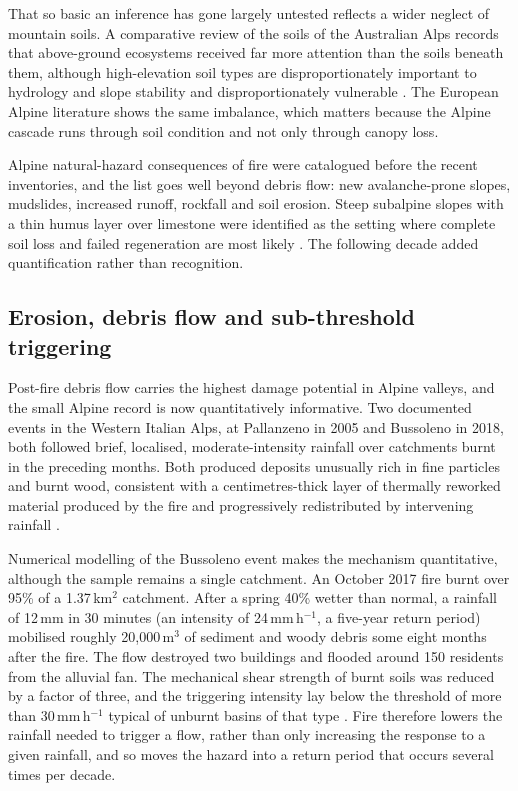 \documentclass[11pt,a4paper]{article}
\begin{document}
That so basic an inference has gone largely untested reflects a wider neglect of mountain soils. A comparative review of the soils of the Australian Alps records that above-ground ecosystems received far more attention than the soils beneath them, although high-elevation soil types are disproportionately important to hydrology and slope stability and disproportionately vulnerable \citep{wilson_distribution_2022}. The European Alpine literature shows the same imbalance, which matters because the Alpine cascade runs through soil condition and not only through canopy loss.

Alpine natural-hazard consequences of fire were catalogued before the recent inventories, and the list goes well beyond debris flow: new avalanche-prone slopes, mudslides, increased runoff, rockfall and soil erosion. Steep subalpine slopes with a thin humus layer over limestone were identified as the setting where complete soil loss and failed regeneration are most likely \citep{muller_forest_2020}. The following decade added quantification rather than recognition.

\subsection{Erosion, debris flow and sub-threshold triggering}

Post-fire debris flow carries the highest damage potential in Alpine valleys, and the small Alpine record is now quantitatively informative. Two documented events in the Western Italian Alps, at Pallanzeno in 2005 and Bussoleno in 2018, both followed brief, localised, moderate-intensity rainfall over catchments burnt in the preceding months. Both produced deposits unusually rich in fine particles and burnt wood, consistent with a centimetres-thick layer of thermally reworked material produced by the fire and progressively redistributed by intervening rainfall \citep{tiranti_wildfires_2021}.

Numerical modelling of the Bussoleno event makes the mechanism quantitative, although the sample remains a single catchment. An October 2017 fire burnt over 95\% of a 1.37\,km$^2$ catchment. After a spring 40\% wetter than normal, a rainfall of 12\,mm in 30 minutes (an intensity of 24\,mm\,h$^{-1}$, a five-year return period) mobilised roughly 20{,}000\,m$^3$ of sediment and woody debris some eight months after the fire. The flow destroyed two buildings and flooded around 150 residents from the alluvial fan. The mechanical shear strength of burnt soils was reduced by a factor of three, and the triggering intensity lay below the threshold of more than 30\,mm\,h$^{-1}$ typical of unburnt basins of that type \citep{laporta_postwildfire_2025}. Fire therefore lowers the rainfall needed to trigger a flow, rather than only increasing the response to a given rainfall, and so moves the hazard into a return period that occurs several times per decade.
\end{document}

